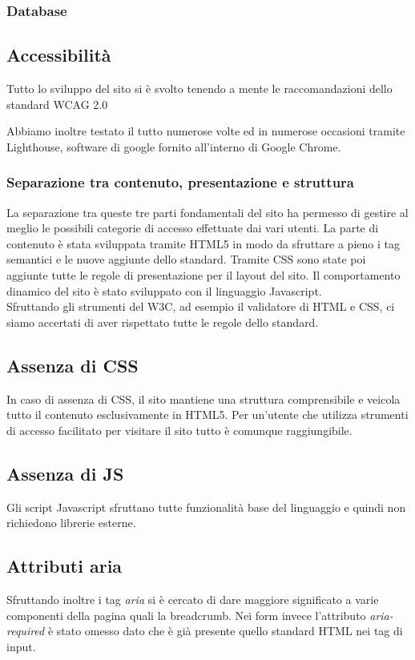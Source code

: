 \subsubsection{Database}

\subsection{Accessibilità}
Tutto lo sviluppo del sito si è svolto tenendo a mente le raccomandazioni dello standard WCAG 2.0

Abbiamo inoltre testato il tutto numerose volte ed in numerose occasioni tramite Lighthouse, software di google fornito all'interno di Google Chrome.

\subsubsection{Separazione tra contenuto, presentazione e struttura}
La separazione tra queste tre parti fondamentali del sito ha permesso di gestire al meglio le possibili categorie di accesso effettuate dai vari utenti. La parte di contenuto è stata sviluppata tramite HTML5 in modo da sfruttare a pieno i tag semantici e le nuove aggiunte dello standard. Tramite CSS sono state poi aggiunte tutte le regole di presentazione per il layout del sito. Il comportamento dinamico del sito è stato sviluppato con il linguaggio Javascript.\\ Sfruttando gli strumenti del W3C, ad esempio il validatore di HTML e CSS, ci siamo accertati di aver rispettato tutte le regole dello standard.

\subsection{Assenza di CSS}
In caso di assenza di CSS, il sito mantiene una struttura comprensibile e veicola tutto il contenuto esclusivamente in HTML5. Per un'utente che utilizza strumenti di accesso facilitato per visitare il sito tutto è comunque raggiungibile.

\subsection{Assenza di JS}
Gli script Javascript sfruttano tutte funzionalità base del linguaggio e quindi non richiedono librerie esterne.

\subsection{Attributi aria}
Sfruttando inoltre i tag \textit{aria} si è cercato di dare maggiore significato a varie componenti della pagina quali la breadcrumb. Nei form invece l'attributo \textit{aria-required} è stato omesso dato che è già presente quello standard HTML nei tag di input.

